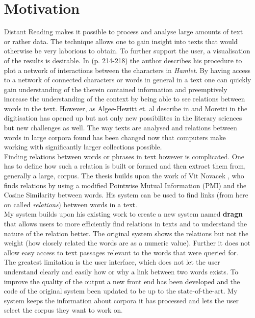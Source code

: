 \section{Motivation}
Distant Reading makes it possible to process and analyse large amounts of text or rather data. The technique allows one to gain insight into texts that would otherwise be very laborious to obtain. To further support the user, a visualisation of the results is desirable. In \cite{moretti13} (p. 214-218) the author describes his procedure to plot a network of interactions between the characters in \textit{Hamlet}.
By having access to a network of connected characters or words in general in a text one can quickly gain understanding of the therein contained information and preemptively increase the understanding of the context by being able to see relations between words in the text. However, as Algee-Hewitt et. al describe in \cite{algee2016canon} and Moretti in \cite{moretti2017patterns} the digitisation has opened up but not only new possibilites in the literary sciences but new challenges as well. The way texts are analysed and relations between words in large corpora found has been changed now that computers make working with significantly larger collections possible.\\
Finding relations between words or phrases in text however is complicated. One has to define how such a relation is built or formed and then extract them from, generally a large, corpus. The thesis builds upon the  work of Vit Novacek \cite{novavcek2014skimmr}, who finds relations by using a modified Pointwise Mutual Information (PMI) and the Cosine Similarity between words. His system can be used to find links (from here on called \textit{relations}) between words in a text.\\
My system builds upon his existing work to create a new system named \textbf{dragn} that allows users to more efficiently find relations in texts and to understand the nature of the relation better. The original system shows the relations but not the weight (how closely related the words are as a numeric value). Further it does not allow easy access to text passages relevant to the words that were queried for. The greatest limitation is the user interface, which does not let the user understand clearly and easily how or why a link between two words exists. To improve the quality of the output a new front end has been developed and the code of the original system been updated to be up to the state-of-the-art. My system keeps the information about corpora it has processed and lets the user select the corpus they want to work on.\\
